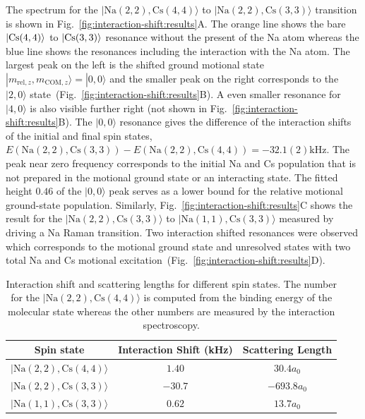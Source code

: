 The spectrum for the $|\mathrm{Na(2, 2),Cs(4, 4)}\rangle$ to $|\mathrm{Na(2, 2),Cs(3, 3)}\rangle$
transition is shown in Fig.~\ref{fig:interaction-shift:results}A.
The orange line shows the bare $|\mathrm{Cs}(4, 4)\rangle$ to $|\mathrm{Cs}(3, 3)\rangle$ resonance without
the present of the Na atom whereas the blue line shows the resonances
including the interaction with the Na atom.
The largest peak on the left is the shifted ground motional state
$|m_{\mathrm{rel},z},m_{\mathrm{COM},z}\rangle = |0,0\rangle$ and the smaller peak on the right
corresponds to the $|2,0\rangle$ state~(Fig.~\ref{fig:interaction-shift:results}B).
A even smaller resonance for $|4,0\rangle$ is also visible further right
(not shown in Fig.~\ref{fig:interaction-shift:results}B).
The $|0,0\rangle$ resonance gives the difference of the interaction shifts
of the initial and final spin states,
$E(\mathrm{Na(2, 2),Cs(3, 3)}) - E(\mathrm{Na(2, 2),Cs(4, 4)})=-32.1(2) \mathrm{kHz}$.
The peak near zero frequency corresponds to the initial Na and Cs population that is not prepared
in the motional ground state or an interacting state.
The fitted height $0.46$ of the $|0,0\rangle$ peak serves as a lower bound for
the relative motional ground-state population.
Similarly, Fig.~\ref{fig:interaction-shift:results}C shows the result for
the $|\mathrm{Na(2, 2),Cs(3, 3)}\rangle$ to $|\mathrm{Na(1, 1),Cs(3, 3)}\rangle$
measured by driving a Na Raman transition.
Two interaction shifted resonances were observed which corresponds to
the motional ground state and unresolved states with two total
Na and Cs motional excitation~(Fig.~\ref{fig:interaction-shift:results}D).

\begin{table}
  \centering
  \caption[Interaction shift and scattering lengths.]{
    Interaction shift and scattering lengths for different spin states.
    The number for the $|\mathrm{Na(2, 2),Cs(4, 4)}\rangle$ is computed from
    the binding energy of the molecular state whereas the other numbers are
    measured by the interaction spectroscopy.
    \label{table:interaction-shift:results}}
  \begin{tabular}{|c|c|c|}
    \hline
    Spin state&Interaction Shift (kHz)&Scattering Length\\\hline
    $|\mathrm{Na(2, 2),Cs(4, 4)}\rangle$&$1.40$&$30.4a_0$\\\hline
    $|\mathrm{Na(2, 2),Cs(3, 3)}\rangle$&$-30.7$&$-693.8a_0$\\\hline
    $|\mathrm{Na(1, 1),Cs(3, 3)}\rangle$&$0.62$&$13.7a_0$\\\hline
  \end{tabular}
\end{table}

